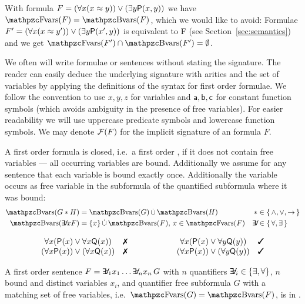 \begin{example}
	With formula \( F = (\forall x (x\approx y)) \lor (\exists y \mathsf{P}(x,y)) \)
	we have \( \fvar(F) = \bvar(F) \), which we would like to avoid:
	Formulae
	\( F' = (\forall x (x\approx y')) \lor (\exists y \mathsf{P}(x',y)) \)
	is equivalent to F (see Section~\vref{sec:semantics})
	and we get
	\( \fvar(F') \cap \bvar(F') = \emptyset \).
\end{example}

We often will write formulae or sentences
without stating the signature.
The reader can easily deduce the underlying  signature with arities
and the set of variables by applying the definitions of the syntax for first order formulae.
We follow the convention to use \( x,y,z \) for variables
and \( \mathsf{a},\mathsf{b},\mathsf{c} \) for constant function symbols
(which avoids ambiguity in the presence of free variables).
For easier readability we will use uppercase predicate symbols and lowercase function symbols.
We may denote \( \mathcal{F}(F) \) for the implicit signature of an formula \( F \).

\begin{definition}\label{def:fof:closed}\label{def:fof:sentence}
	A first order formula is closed, i.e.~a first order ,
	if it does not contain free variables --- all occurring variables are bound.
	Additionally we assume for any sentence
	that each variable is bound exactly once.
	Additionally the variable occurs as free variable
	in the subformula of the quantified subformula
	where it was bound:
	\begin{align*}
	\bvar(G * H) &= \bvar(G)\disjointunion\bvar(H)
	 &*& \in \{ \, \land, \lor, \limp \, \}
	\\
	\bvar(\quantify x F) &= \{x\}\disjointunion\bvar(F)\text{, } x\in\fvar(F)
	&\quantify& \in \{ \, \forall, \exists \, \}
\end{align*}
\end{definition}

\begin{example}
	\[
	\begin{array}{clccl}
		\forall x ({\mP(x) \lor \forall x {\mQ(x)}}) &
		\text{\xmark}
		&\qquad\qquad
		&
		\forall x ({\mP(x) \lor \forall y {\mQ(y)}}) &
		\text{\cmark}
		\\
		(\forall x {\mP(x)}) \lor (\forall x {\mQ(x)}) &
		\text{\xmark}
		&&
		(\forall x {\mP(x)}) \lor (\forall y {\mQ(y)}) &
		\text{\cmark}
	\end{array}
	\]

\end{example}

\begin{definition}[\PNF]
	A first order sentence \( F = \quantify_1 x_1 \ldots \quantify_n x_n\, G \)
	with \( n \) quantifiers \( \quantify_i \in \{ \exists, \forall \} \),
	\( n \) bound and distinct variables \( x_i \),
	and quantifier free subformula \( G \) with
	a matching set of free variables, i.e.~\( \fvar(G) = \bvar(F) \),
	is in .
\end{definition}


